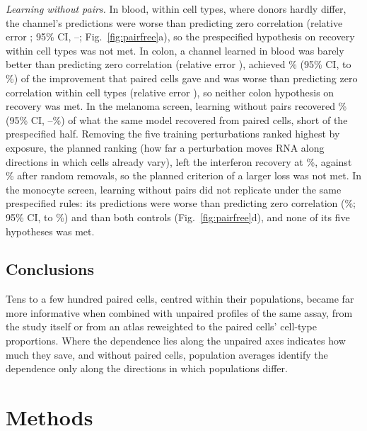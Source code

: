 \documentclass[pdflatex,sn-vancouver-num,iicol]{sn-jnl}
\begin{document}
\textit{Learning without pairs.} In blood, within cell types, where donors hardly differ, the channel's predictions were worse than predicting zero correlation (relative error \XsHaoWErrPfMeans; 95\% CI, \XsHaoWErrPfMeansLo--\XsHaoWErrPfMeansHi; Fig.~\ref{fig:pairfree}a), so the prespecified hypothesis on recovery within cell types was not met. In colon, a channel learned in blood was barely better than predicting zero correlation (relative error \XsColonErrPfMeans), achieved \XsColonShare\% (95\% CI, \XsColonShareLo{} to \XsColonShareHi\%) of the improvement that paired cells gave and was worse than predicting zero correlation within cell types (relative error \XsColonWErrPfMeans), so neither colon hypothesis on recovery was met. In the melanoma screen, learning without pairs recovered \PtRfShare\% (95\% CI, \PtRfShareLo--\PtRfShareHi\%) of what the same model recovered from paired cells, short of the prespecified half. Removing the five training perturbations ranked highest by exposure, the planned ranking (how far a perturbation moves RNA along directions in which cells already vary), left the interferon recovery at \DsFiveIfnExp\%, against \DsFiveIfnRand\% after random removals, so the planned criterion of a larger loss was not met. In the monocyte screen, learning without pairs did not replicate under the same prespecified rules: its predictions were worse than predicting zero correlation (\RpPrimary\%; 95\% CI, \RpPrimaryLo{} to \RpPrimaryHi\%) and than both controls (Fig.~\ref{fig:pairfree}d), and none of its five hypotheses was met.

\subsection*{Conclusions}
Tens to a few hundred paired cells, centred within their populations, became far more informative when combined with unpaired profiles of the same assay, from the study itself or from an atlas reweighted to the paired cells' cell-type proportions. Where the dependence lies along the unpaired axes indicates how much they save, and without paired cells, population averages identify the dependence only along the directions in which populations differ.

\section{Methods}
\end{document}
